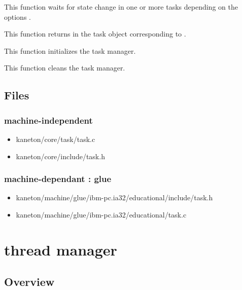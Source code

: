 {
  This function waits for state change in one or more tasks
  depending on the options .

}

{
  This function returns in  the task object corresponding
  to .
}

{
  This function initializes the task manager.
}

{
  This function cleans the task manager.
}

\subsection*{Files}

\subsubsection{\color{filerefcolor} machine-independent}
\begin{itemize}
\item kaneton/core/task/task.c
\item kaneton/core/include/task.h
\end{itemize}

\subsubsection{\color{filerefcolor} machine-dependant : glue}
\begin{itemize}
\item kaneton/machine/glue/ibm-pc.ia32/educational/include/task.h
\item kaneton/machine/glue/ibm-pc.ia32/educational/task.c
\end{itemize}

%
%

\newpage

\section{\textbf{thread} manager}
\subsection*{Overview}

